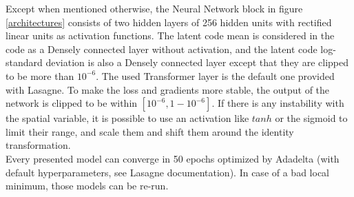 \documentclass[letterpaper, twoside]{article}
\begin{document}
Except when mentioned otherwise, the Neural Network block in figure \ref{architectures} consists of two hidden layers of 256 hidden units with rectified linear units as activation functions. The latent code mean is considered in the code as a Densely connected layer without activation, and the latent code log-standard deviation is also a Densely connected layer except that they are clipped to be more than $10^{-6}$. The used Transformer layer is the default one provided with Lasagne. To make the loss and gradients more stable, the output of the network is clipped to be within $[10^{-6}, 1 - 10^{-6}]$. If there is any instability with the spatial variable, it is possible to use an activation like $tanh$ or the sigmoid to limit their range, and scale them and shift them around the identity transformation.\\
Every presented model can converge in 50 epochs optimized by Adadelta (with default hyperparameters, see Lasagne documentation). In case of a bad local minimum, those models can be re-run.
\end{document}
